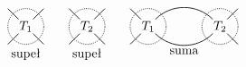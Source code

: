 \[
	\begin{tikzpicture}[baseline=-0.65ex, scale=0.1]
	\useasboundingbox (-5, -9) rectangle (5, 5);
		\draw[semithick] (-2, -2) to (-5,-5);
		\draw[semithick] (2, 2) to (5,5);
		\draw[semithick] (2, -2) to (5,-5);
		\draw[semithick] (-2, 2) to (-5,5);		%
		\draw[semithick, densely dotted] (-0, 0) circle (5);
		\node at (0, 0) {$T_1$};
		\node [below] at (0, -5) {supeł};
	\end{tikzpicture}
	\quad \quad
	\begin{tikzpicture}[baseline=-0.65ex, scale=0.1]
	\useasboundingbox (-5, -9) rectangle (5, 5);
		\draw[semithick] (-2, -2) to (-5,-5);
		\draw[semithick] (2, 2) to (5,5);
		\draw[semithick] (2, -2) to (5,-5);
		\draw[semithick] (-2, 2) to (-5,5);		%
		\draw[semithick, densely dotted] (-0, 0) circle (5);
		\node at (0, 0) {$T_2$};
		\node [below] at (0, -5) {supeł};
	\end{tikzpicture}
	\quad \quad
	\begin{tikzpicture}[baseline=-0.65ex, scale=0.1]
	\useasboundingbox (-15, -9) rectangle (15, 5);
		\draw[semithick] (-12, -2) to (-15,-5);
		\draw[semithick] (-12, 2) to (-15,5);		%
		\draw[semithick, densely dotted] (-10, 0) circle (5);
		\node at (-10, 0) {$T_1$};
		\draw[semithick] (12, -2) to (15,-5);
		\draw[semithick] (12, 2) to (15,5);		%
		\draw[semithick, densely dotted] (10, 0) circle (5);
		\node at (10, 0) {$T_2$};
		\draw[semithick] (-8, 2) [in=135, out=45] to (8, 2);
		\draw[semithick] (-8, -2) [in=-135, out=-45] to (8, -2);
		\node [below] at (0, -5) {suma};
	\end{tikzpicture}
\]